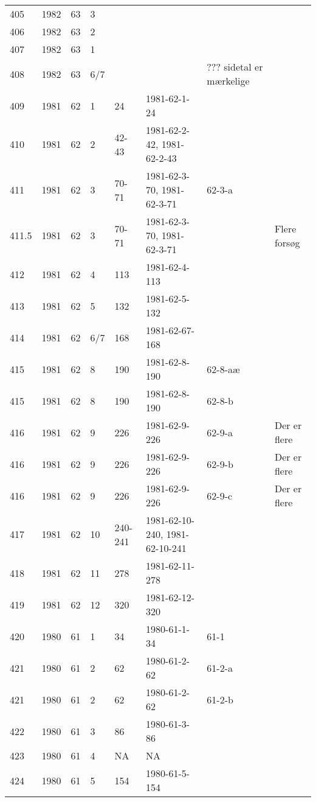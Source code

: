 \begin{longtable}{ |l|l|l|l|l|l|l|l| }
405 & 1982 & 63 &     3 &         &                &  & \\
406 & 1982 & 63 &     2 &         &                &  & \\
407 & 1982 & 63 &     1 &         &                &  & \\
408 & 1982 & 63 &   6/7 &         &                & ??? sidetal er mærkelige & \\
409 & 1981 & 62 &     1 &      24 &   1981-62-1-24 &  & \\
410 & 1981 & 62 &     2 &   42-43 & 1981-62-2-42, 1981-62-2-43 &  & \\
411 & 1981 & 62 &     3 &   70-71 & 1981-62-3-70, 1981-62-3-71 & 62-3-a & \\
411.5 & 1981 & 62 &   3 &   70-71 & 1981-62-3-70, 1981-62-3-71 &  & Flere forsøg \\
412 & 1981 & 62 &     4 &     113 &  1981-62-4-113 &  & \\
413 & 1981 & 62 &     5 &     132 &  1981-62-5-132 &  & \\
414 & 1981 & 62 &   6/7 &     168 & 1981-62-67-168 &  & \\
415 & 1981 & 62 &     8 &     190 &  1981-62-8-190 & 62-8-aæ & \\
415 & 1981 & 62 &     8 &     190 &  1981-62-8-190 & 62-8-b & \\
416 & 1981 & 62 &     9 &     226 &  1981-62-9-226 &  62-9-a & Der er flere \\
416 & 1981 & 62 &     9 &     226 &  1981-62-9-226 &  62-9-b & Der er flere \\
416 & 1981 & 62 &     9 &     226 &  1981-62-9-226 &  62-9-c & Der er flere \\
417 & 1981 & 62 &    10 & 240-241 & 1981-62-10-240, 1981-62-10-241 &  & \\
418 & 1981 & 62 &    11 &     278 & 1981-62-11-278 &  & \\
419 & 1981 & 62 &    12 &     320 & 1981-62-12-320 &  & \\
420 & 1980 & 61 &     1 &      34 &   1980-61-1-34 & 61-1 & \\
421 & 1980 & 61 &     2 &      62 &   1980-61-2-62 & 61-2-a & \\
421 & 1980 & 61 &     2 &      62 &   1980-61-2-62 & 61-2-b & \\
422 & 1980 & 61 &     3 &      86 &   1980-61-3-86 &  & \\
423 & 1980 & 61 &     4 &      NA &    NA          &  & \\
424 & 1980 & 61 &     5 &     154 & 1980-61-5-154  &  & \\

\end{longtable}
